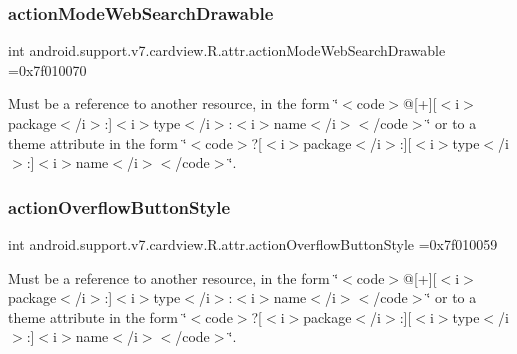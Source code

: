 \subsubsection{\texorpdfstring{action\+Mode\+Web\+Search\+Drawable}{actionModeWebSearchDrawable}}
{\footnotesize\ttfamily int android.\+support.\+v7.\+cardview.\+R.\+attr.\+action\+Mode\+Web\+Search\+Drawable =0x7f010070\hspace{0.3cm}{\ttfamily [static]}}

Must be a reference to another resource, in the form \char`\"{}$<$code$>$@\mbox{[}+\mbox{]}\mbox{[}$<$i$>$package$<$/i$>$\+:\mbox{]}$<$i$>$type$<$/i$>$\+:$<$i$>$name$<$/i$>$$<$/code$>$\char`\"{} or to a theme attribute in the form \char`\"{}$<$code$>$?\mbox{[}$<$i$>$package$<$/i$>$\+:\mbox{]}\mbox{[}$<$i$>$type$<$/i$>$\+:\mbox{]}$<$i$>$name$<$/i$>$$<$/code$>$\char`\"{}. \mbox{\label{classandroid_1_1support_1_1v7_1_1cardview_1_1R_1_1attr_abfea2f33047e08b00173057b1ee9045d}} 
\subsubsection{\texorpdfstring{action\+Overflow\+Button\+Style}{actionOverflowButtonStyle}}
{\footnotesize\ttfamily int android.\+support.\+v7.\+cardview.\+R.\+attr.\+action\+Overflow\+Button\+Style =0x7f010059\hspace{0.3cm}{\ttfamily [static]}}

Must be a reference to another resource, in the form \char`\"{}$<$code$>$@\mbox{[}+\mbox{]}\mbox{[}$<$i$>$package$<$/i$>$\+:\mbox{]}$<$i$>$type$<$/i$>$\+:$<$i$>$name$<$/i$>$$<$/code$>$\char`\"{} or to a theme attribute in the form \char`\"{}$<$code$>$?\mbox{[}$<$i$>$package$<$/i$>$\+:\mbox{]}\mbox{[}$<$i$>$type$<$/i$>$\+:\mbox{]}$<$i$>$name$<$/i$>$$<$/code$>$\char`\"{}. \mbox{\label{classandroid_1_1support_1_1v7_1_1cardview_1_1R_1_1attr_a50256030a433db5bbcd0af91e846f686}} 
